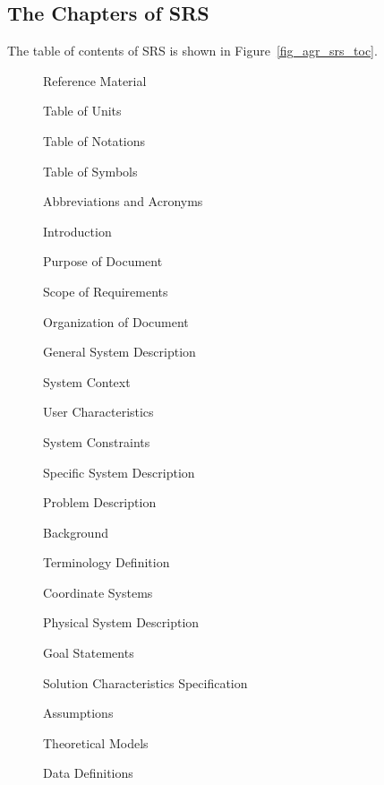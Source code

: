 \subsection{The Chapters of SRS}
The table of contents of SRS is shown in Figure~\ref{fig_agr_srs_toc}.
\begin{figure}[hp]
    \begin{myEnumerate}
	\item Reference Material
	\begin{myEnumerate}
	\item Table of Units
	\item Table of Notations
	\item Table of Symbols
	\item Abbreviations and Acronyms
	\end{myEnumerate}
	\item Introduction
	\begin{myEnumerate}
	\item Purpose of Document
	\item Scope of Requirements
	\item Organization of Document
	\end{myEnumerate}
	\item General System Description
	\begin{myEnumerate}
	\item System Context
	\item User Characteristics
	\item System Constraints
	\end{myEnumerate}
	\item Specific System Description
	\begin{myEnumerate}
	\item Problem Description
	\begin{myEnumerate}
	\item Background
	\item Terminology Definition
	\item Coordinate Systems
	\item Physical System Description
	\item Goal Statements
	\end{myEnumerate}
	\item Solution Characteristics Specification
	\begin{myEnumerate}
	\item Assumptions
	\item Theoretical Models
	\item Data Definitions

\end{myEnumerate}
\end{myEnumerate}
\end{myEnumerate}
\end{figure}
